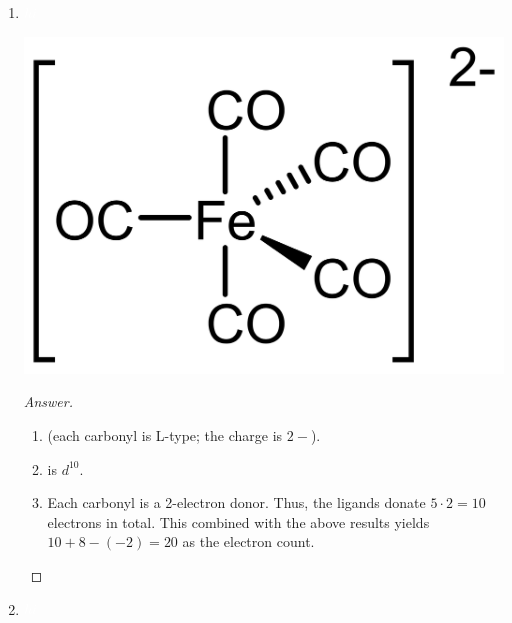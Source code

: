 \documentclass[../psets.tex]{subfiles}
\begin{document}
\begin{enumerate}
\begin{enumerate}[label={\arabic*)}]
\begin{proof}[Answer]
\begin{enumerate}[label={(\roman*)}]
                \item {} (each carbonyl is L-type; the hydride is X-type; the propene is L-type).
                \item {} is $d^8$.
                \item Each carbonyl is a 2-electron donor, the hydrogen is a 1-electron donor, and propene is a 2-electron donor. Thus, the ligands donate $3\cdot 2+1\cdot 1+1\cdot 2=9$ electrons in total. This combined with the above result yields $9+9=18$ as the electron count.
            \end{enumerate}
        \end{proof}
        \item ${\color{white}hi}$
        \begin{center}
            \includegraphics[width=0.25\linewidth]{../ExtFiles/pset1-1-03.png}
        \end{center}
        \begin{proof}[Answer]\leavevmode
            \begin{enumerate}[label={(\roman*)}]
                \item {} (each carbonyl is L-type; the charge is $2-$).
                \item {} is $d^{10}$.
                \item Each carbonyl is a 2-electron donor. Thus, the ligands donate $5\cdot 2=10$ electrons in total. This combined with the above results yields $10+8-(-2)=20$ as the electron count.
            \end{enumerate}
        \end{proof}
        \newpage
        \item ${\color{white}hi}$
        \begin{center}

\end{center}
\end{enumerate}
\end{enumerate}
\end{document}
